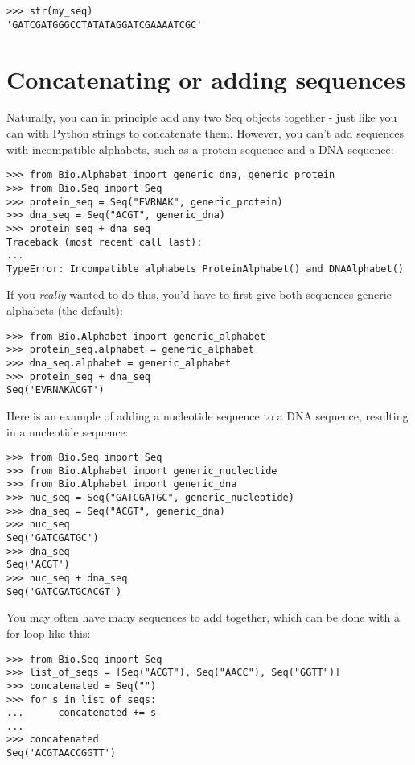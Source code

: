 \begin{verbatim}
>>> str(my_seq)
'GATCGATGGGCCTATATAGGATCGAAAATCGC'
\end{verbatim}

\section{Concatenating or adding sequences}

Naturally, you can in principle add any two Seq objects together - just like you can with Python strings to concatenate them.  However, you can't add sequences with incompatible alphabets, such as a protein sequence and a DNA sequence:

\begin{verbatim}
>>> from Bio.Alphabet import generic_dna, generic_protein
>>> from Bio.Seq import Seq
>>> protein_seq = Seq("EVRNAK", generic_protein)
>>> dna_seq = Seq("ACGT", generic_dna)
>>> protein_seq + dna_seq
Traceback (most recent call last):
...
TypeError: Incompatible alphabets ProteinAlphabet() and DNAAlphabet()
\end{verbatim}

If you \emph{really} wanted to do this, you'd have to first give both sequences generic alphabets (the default):

\begin{verbatim}
>>> from Bio.Alphabet import generic_alphabet
>>> protein_seq.alphabet = generic_alphabet
>>> dna_seq.alphabet = generic_alphabet
>>> protein_seq + dna_seq
Seq('EVRNAKACGT')
\end{verbatim}

Here is an example of adding a nucleotide sequence to a DNA sequence,
resulting in a nucleotide sequence:

\begin{verbatim}
>>> from Bio.Seq import Seq
>>> from Bio.Alphabet import generic_nucleotide
>>> from Bio.Alphabet import generic_dna
>>> nuc_seq = Seq("GATCGATGC", generic_nucleotide)
>>> dna_seq = Seq("ACGT", generic_dna)
>>> nuc_seq
Seq('GATCGATGC')
>>> dna_seq
Seq('ACGT')
>>> nuc_seq + dna_seq
Seq('GATCGATGCACGT')
\end{verbatim}

You may often have many sequences to add together, which can be done with a for loop like this:

\begin{verbatim}
>>> from Bio.Seq import Seq
>>> list_of_seqs = [Seq("ACGT"), Seq("AACC"), Seq("GGTT")]
>>> concatenated = Seq("")
>>> for s in list_of_seqs:
...      concatenated += s
...
>>> concatenated
Seq('ACGTAACCGGTT')
\end{verbatim}

